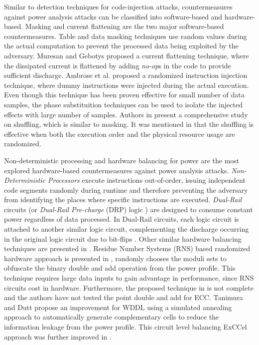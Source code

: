 \documentclass{article}
\begin{document}
Similar  to  detection   techniques   for   code-injection   attacks,
countermeasures against power analysis attacks can be classified into
software-based and  hardware-based. Masking and
current flattening are the  two major software-based countermeasures.
Table and data masking techniques \cite{coron00masking,gebotys06masking,Goubin99DPAmask,messerges02SMART}
use  random   values   during   the actual computation to prevent the 
processed data being  exploited by the adversary. Muresan and Gebotys
\cite{muresan04currentflat} proposed a current  flattening technique,
where the dissipated current is flattened  by  adding {\it no-op}s in
the  code  to  provide sufficient discharge. Ambrose et al. \cite{ambrose12randomized} 
proposed a randomized instruction injection technique, where dummy instructions 
were injected during the actual execution. Even though this technique has been proven
effective for small number of data samples, 
the phase  substituition techniques \cite{gebotys07phasesub} can be used
to isolate the injected effects with large number of samples.  
Authors in \cite{Veyrat-Charvillon12Shuffling} present a comprehensive study on
shuffling, which is similar to masking. It was mentioned in \cite{Veyrat-Charvillon12Shuffling}
that the shuffling is effective when both the execution order and the physical resource usage are randomized. 



Non-deterministic processing and hardware balancing for power are the
most  explored hardware-based  countermeasures against power analysis
attacks. {\it Non-Deterministic Processors} \cite{May01NDICP} execute
instructions  out-of-order, issuing  independent    code segments
randomly during  runtime and therefore preventing the  adversary from identifying 
the places where specific instructions are executed.  \emph{Dual-Rail} circuits \cite{sokolov05DualRail}  (or
\emph{Dual-Rail Pre-charge}  (DRP)  logic \cite{popp05balancing})  are
designed to consume constant   power regardless of data processed. In
Dual-Rail circuits, each  logic  circuit     is attached to another
similar logic circuit,  complementing  the discharge occurring in the
original logic circuit due to     bit-flips  \cite{saputra03masking}.
Other  similar       hardware balancing techniques are  presented  in \cite{hwang06coprocdesign,popp05balancing,tiri04ASIC,tiri2006WDDL}.
Residue Number Systems (RNS) based randomized hardware approach is presented in \cite{ambrose13DARNS}, randomly 
chooses the moduli sets to obfuscate the binary double and add operation from the power profile. This technique requires 
large data inputs to gain advantage in performance, since RNS circuits cost in hardware. Furthermore, the proposed
technique in  \cite{ambrose13DARNS} is not complete and the authors have not tested the point double and add for ECC. 
Tanimura and Dutt \cite{tanimura10ExCCel} propose an improvement for WDDL \cite{tiri2006WDDL}
using a simulated annealing approach to automatically generate complementary cells to reduce the information leakage from the
power profile. This circuit level balancing ExCCel approach \cite{tanimura10ExCCel} was further improved in \cite{tanimura12HDRL, tanimura12LRCG}. 
\end{document}
